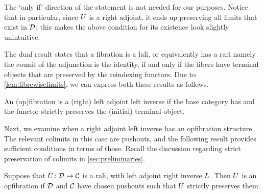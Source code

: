 \documentclass{amsart}
\begin{document}
The `only if' direction of the statement is not needed for our purposes. Notice that in particular, since $U$ is a right adjoint, it ends up preserving all limits that exist in $\mathcal{D}$; this makes the above condition for its existence look slightly unintuitive. 

The dual result states that a fibration is a lali, or equivalently has a rari namely the counit of the adjunction is the identity, if and only if the fibers have terminal objects that are preserved by the reindexing functors. Due to \cref{lem:fibrewiselimits}, we can express both these results as follows.

\begin{cor}
An (op)fibration is a (right) left adjoint left inverse if the base category has and the functor strictly preserves the (initial) terminal object.
\end{cor}

Next, we examine when a right adjoint left inverse has an opfibration structure. The relevant colimits in this case are pushouts, and the following result provides sufficient conditions in terms of those. Recall the discussion regarding strict preservation of colimits in \cref{sec:preliminaries}.

\begin{prop}\label{prop:laritoopfib}
Suppose that $U\colon\mathcal{D}\to\mathcal{C}$ is a rali, with left adjoint right inverse $L$. Then $U$ is an opfibration if $\mathcal{D}$ and $\mathcal{C}$ have chosen pushouts such that $U$ strictly preserves them.
\end{prop}
\end{document}
